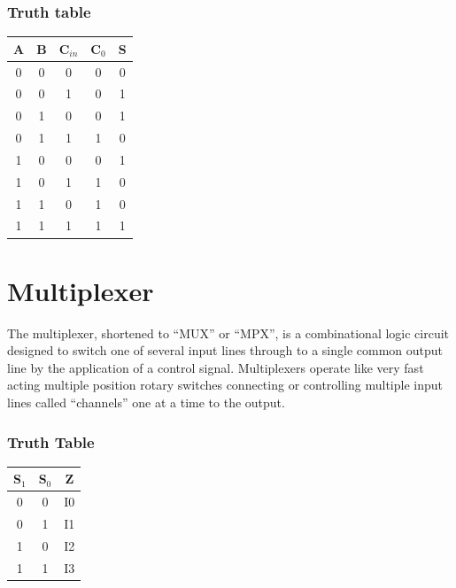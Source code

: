 \documentclass{report}
\begin{document}
\subsubsection{Truth table}
\begin{center}
\begin{tabular}{|c|c|c|c|c|}
 \hline
    A & B & C$_{in}$ & C$_0$ & S  \\ \hline
    0 & 0 & 0 & 0 & 0 \\
    0 & 0 & 1 & 0 & 1 \\
    0 & 1 & 0 & 0 & 1 \\
    0 & 1 & 1 & 1 & 0 \\
    1 & 0 & 0 & 0 & 1 \\
    1 & 0 & 1 & 1 & 0 \\
    1 & 1 & 0 & 1 & 0 \\
    1 & 1 & 1 & 1 & 1 \\

 \hline
\end{tabular}
\end{center}

\section{Multiplexer}
The multiplexer, shortened to “MUX” or “MPX”, is a combinational logic circuit designed to switch one of several input lines through to a single common output line by the application of a control signal. Multiplexers operate like very fast acting multiple position rotary switches connecting or controlling multiple input lines called “channels” one at a time to the output.

\subsubsection{Truth Table}
\begin{center}
\begin{tabular}{ |c|c|c| } 
 \hline
 S$_1$ & S$_0$ & Z \\ \hline
 0 & 0 & I0 \\ 
 0 & 1 & I1 \\ 
 1 & 0 & I2 \\ 
 1 & 1 & I3 \\ 
 \hline
\end{tabular}
\end{center}
\end{document}
